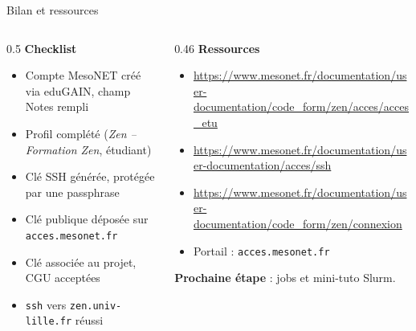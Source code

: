 \documentclass[8pt,aspectratio=169]{beamer}
\begin{document}
\begin{frame}{Bilan et ressources}
\begin{columns}[T]
\begin{column}{0.5\textwidth}
\textbf{Checklist}
\begin{itemize}
\item[$\square$] Compte MesoNET créé via eduGAIN, champ \og Notes \fg{} rempli
\item[$\square$] Profil complété (\emph{Zen -- Formation Zen}, étudiant)
\item[$\square$] Clé SSH générée, protégée par une passphrase
\item[$\square$] Clé publique déposée sur \texttt{acces.mesonet.fr}
\item[$\square$] Clé associée au projet, CGU acceptées
\item[$\square$] \texttt{ssh} vers \texttt{zen.univ-lille.fr} réussi
\end{itemize}
\end{column}
\begin{column}{0.46\textwidth}
\textbf{Ressources}
\begin{itemize}
\item {\footnotesize\url{https://www.mesonet.fr/documentation/user-documentation/code_form/zen/acces/acces_etu}}
\item {\footnotesize\url{https://www.mesonet.fr/documentation/user-documentation/acces/ssh}}
\item {\footnotesize\url{https://www.mesonet.fr/documentation/user-documentation/code_form/zen/connexion}}
\item Portail : \texttt{acces.mesonet.fr}
\end{itemize}
\medskip
\textbf{Prochaine étape} : jobs et mini-tuto Slurm.
\end{column}
\end{columns}
\end{frame}
\end{document}
